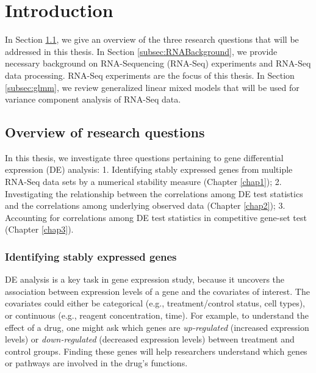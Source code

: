 \section{Introduction}\label{sec:intro}
In Section \ref{subsec:biol}, we give an overview of the three research questions
that will be addressed in this thesis.
In Section \ref{subsec:RNABackground}, we provide necessary background on 
RNA-Sequencing (RNA-Seq) experiments and RNA-Seq data processing.
RNA-Seq experiments are the focus of this thesis. 
In Section \ref{subsec:glmm}, we review generalized linear mixed models
that will be used for variance component analysis of RNA-Seq data.

\subsection{Overview of research questions}\label{subsec:biol}




In this thesis, we investigate three questions pertaining to gene  differential expression (DE)
analysis: 1. Identifying stably expressed genes from multiple RNA-Seq data sets by a numerical 
stability measure (Chapter \ref{chap1}); 2. Investigating the relationship between the correlations
among DE test statistics and the correlations among underlying observed data
(Chapter \ref{chap2}); 3. Accounting for correlations among DE test statistics in competitive 
gene-set test (Chapter
\ref{chap3}). 



\subsubsection{Identifying stably expressed genes}
DE analysis is a key task in gene expression study, because it uncovers 
the association between expression levels of a gene and the covariates of interest. The covariates 
could either be categorical (e.g., treatment/control status, cell types), or continuous (e.g., 
reagent concentration, time). For example, to understand the effect of a drug, one might ask which 
genes are \textit{up-regulated} (increased expression levels) or \textit{down-regulated} (decreased 
expression levels) between treatment and control groups. Finding these genes will help researchers 
understand which genes or pathways are involved in the drug's functions. 

